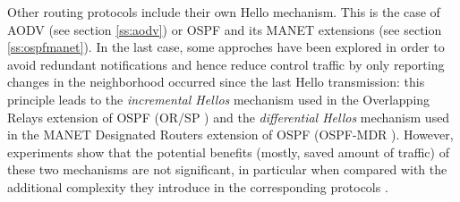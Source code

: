 Other routing protocols include their own Hello mechanism. This is the case of AODV \cite{rfc3561} (see section \ref{ss:aodv}) or OSPF and its MANET extensions \cite{rfc5449,rfc5614,rfc5820} (see section \ref{ss:ospfmanet}). In the last case, some approches have been explored in order to avoid redundant notifications and hence reduce control traffic by only reporting changes in the neighborhood occurred since the last Hello transmission: this principle leads to the {\em incremental Hellos} mechanism used in the Overlapping Relays extension of OSPF (OR/SP \cite{rfc5820}) and the {\em differential Hellos} mechanism used in the MANET Designated Routers extension of OSPF (OSPF-MDR \cite{rfc5614}). However, experiments show that the potential benefits (mostly, saved amount of traffic) of these two mechanisms are not significant, in particular when compared with the additional complexity they introduce in the corresponding protocols \cite{aircc}.




